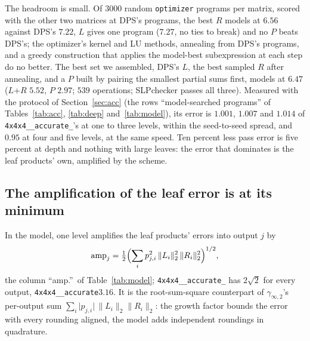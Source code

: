 \documentclass[11pt]{article}
\theoremstyle{remark}
\newcommand{\ginf}{\gamma_{\infty,2}}
\newcommand{\acc}{\texttt{4x4x4\_\allowbreak 48\_\allowbreak accurate}\xspace}
\newcommand{\acct}{\texttt{4x4x4\_\allowbreak 48\_\allowbreak accurate\_\allowbreak 262}\xspace}
\begin{document}
The headroom is small.  Of $3000$ random \texttt{optimizer} programs
per matrix, scored with the other two matrices at DPS's programs, the
best $R$ models at $6.56$ against DPS's $7.22$, $L$ gives one program
($7.27$, no ties to break) and no $P$ beats DPS's; the optimizer's
kernel and LU methods, annealing from DPS's programs, and a greedy
construction that applies the model-best subexpression at each step do
no better.  The best set we assembled, DPS's $L$, the best sampled $R$
after annealing, and a $P$ built by pairing the smallest partial sums
first, models at $6.47$ ($L$+$R$ $5.52$, $P$ $2.97$; $539$ operations;
SLPchecker passes all three).  Measured with the protocol of
Section~\ref{sec:acc} (the rows ``model-searched programs'' of
Tables~\ref{tab:acc}, \ref{tab:deep} and~\ref{tab:model}), its error is
$1.001$, $1.007$ and $1.014$ of \acct's at one to three levels, within
the seed-to-seed spread, and $0.95$ at four and five levels, at the same
speed.  Ten percent less pass error is five percent at depth and
nothing with large leaves: the error that dominates is the leaf
products' own, amplified by the scheme.

\subsection{The amplification of the leaf error is at its minimum}\label{sec:ampfloor}

In the model, one level amplifies the leaf products' errors into output
$j$ by
\begin{equation}\label{eq:amp}
\mathrm{amp}_j=\tfrac12\Bigl(\sum_i p_{j,i}^2\,\lVert L_i\rVert_2^2\,
\lVert R_i\rVert_2^2\Bigr)^{1/2},
\end{equation}
the column ``amp.''\ of Table~\ref{tab:model}; \acct has $2\sqrt2$ for
every output, \acc $3.16$.  It is the root-sum-square counterpart of
$\ginf$'s per-output sum
$\sum_i\lvert p_{j,i}\rvert\,\lVert L_i\rVert_2\lVert R_i\rVert_2$: the
growth factor bounds the error with every rounding aligned, the model
adds independent roundings in quadrature.
\end{document}
